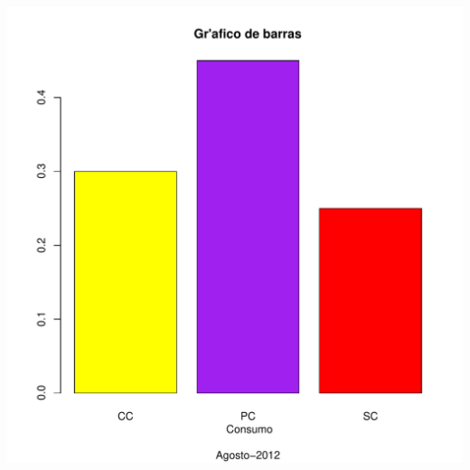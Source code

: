 \documentclass[12pt,letterpaper]{article}\usepackage[]{graphicx}\usepackage[]{color}
\makeatletter
\def\maxwidth{ %
  \ifdim\Gin@nat@width>\linewidth
    \linewidth
  \else
    \Gin@nat@width
  \fi
}
\newenvironment{knitrout}{}{} %
\makeatother
\begin{document}
\begin{knitrout}
\includegraphics[width=\maxwidth]{figure/unnamed-chunk-8-2} 

\end{knitrout}
\end{document}
